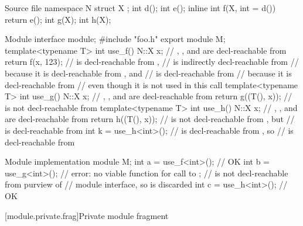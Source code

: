 \pnum
\begin{example}
\begin{codeblocktu}{Source file }
namespace N {
  struct X {};
  int d();
  int e();
  inline int f(X, int = d()) { return e(); }
  int g(X);
  int h(X);
}
\end{codeblocktu}

\begin{codeblocktu}{Module  interface}
module;
#include "foo.h"
export module M;
template<typename T> int use_f() {
  N::X x;                       // , , and \tcode{::} are decl-reachable from 
  return f(x, 123);             //  is decl-reachable from ,
                                //  is indirectly decl-reachable from 
                                //   because it is decl-reachable from , and
                                //  is decl-reachable from 
                                //   because it is decl-reachable from 
                                //   even though it is not used in this call
}
template<typename T> int use_g() {
  N::X x;                       // , , and \tcode{::} are decl-reachable from 
  return g((T(), x));           //  is not decl-reachable from 
}
template<typename T> int use_h() {
  N::X x;                       // , , and \tcode{::} are decl-reachable from 
  return h((T(), x));           //  is not decl-reachable from , but
                                //  is decl-reachable from 
}
int k = use_h<int>();
  //  is decl-reachable from , so
  //  is decl-reachable from 
\end{codeblocktu}

\begin{codeblocktu}{Module  implementation}
module M;
int a = use_f<int>();           // OK
int b = use_g<int>();           // error: no viable function for call to ;
                                //  is not decl-reachable from purview of
                                // module  interface, so is discarded
int c = use_h<int>();           // OK
\end{codeblocktu}
\end{example}

[module.private.frag]{Private module fragment}

